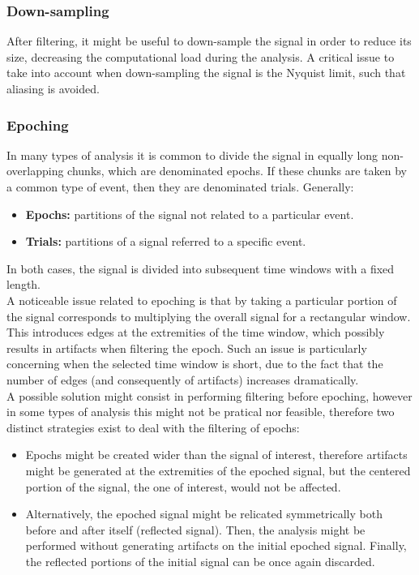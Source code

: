 \subsubsection{Down-sampling}
After filtering, it might be useful to down-sample the signal in order to reduce
its size, decreasing the computational load during the analysis. A critical issue to
take into account when down-sampling the signal is the Nyquist limit, such that
aliasing is avoided.
\subsubsection{Epoching}
In many types of analysis it is common to divide the signal in equally long
non-overlapping chunks, which are denominated epochs. If these chunks are taken
by a common type of event, then they are denominated trials. Generally:
\begin{itemize}
    \item \textbf{Epochs:} partitions of the signal not related to a particular event.
    \item \textbf{Trials:} partitions of a signal referred to a specific event.
\end{itemize}
In both cases, the signal is divided into subsequent time windows with a fixed
length.\\
A noticeable issue related to epoching is that by taking a particular portion of
the signal corresponds to multiplying the overall signal for a rectangular window.
This introduces edges at the extremities of the time window, which possibly results
in artifacts when filtering the epoch. Such an issue is particularly concerning when
the selected time window is short, due to the fact that the number of edges
(and consequently of artifacts) increases dramatically.\\
A possible solution might consist in performing filtering before epoching, however
in some types of analysis this might not be pratical nor feasible, therefore two
distinct strategies exist to deal with the filtering of epochs:
\begin{itemize}
    \item Epochs might be created wider than the signal of interest, therefore
    artifacts might be generated at the extremities of the epoched signal, but the
    centered portion of the signal, the one of interest, would not be affected.
    \item Alternatively, the epoched signal might be relicated symmetrically both
    before and after itself (reflected signal). Then, the analysis might be performed
    without generating artifacts on the initial epoched signal. Finally, the reflected
    portions of the initial signal can be once again discarded.
\end{itemize}
